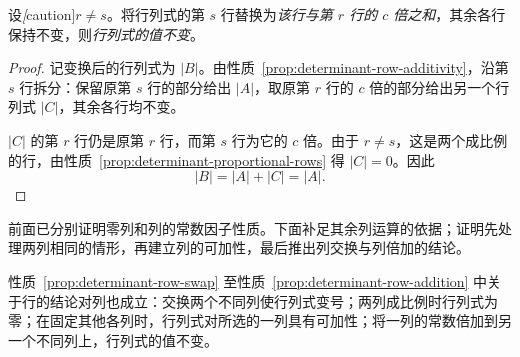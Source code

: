\begin{property}[一行的倍数加到另一行]
\label{prop:determinant-row-addition}
设\emph[caution]{$r\ne s$}。将行列式的第 $s$ 行替换为\emph{该行与第 $r$ 行的 $c$ 倍之和}，其余各行保持不变，则\emph{行列式的值不变}。
\end{property}

\begin{proof}
记变换后的行列式为 $|B|$。由性质~\ref{prop:determinant-row-additivity}，沿第 $s$ 行拆分：保留原第 $s$ 行的部分给出 $|A|$，取原第 $r$ 行的 $c$ 倍的部分给出另一个行列式 $|C|$，其余各行均不变。

$|C|$ 的第 $r$ 行仍是原第 $r$ 行，而第 $s$ 行为它的 $c$ 倍。由于 $r\ne s$，这是两个成比例的行，由性质~\ref{prop:determinant-proportional-rows} 得 $|C|=0$。因此
\[
    |B|=|A|+|C|=|A|.
\]
\end{proof}

前面已分别证明零列和列的常数因子性质。下面补足其余列运算的依据；证明先处理两列相同的情形，再建立列的可加性，最后推出列交换与列倍加的结论。

\begin{proposition}[对应的列运算性质]
\label{prop:determinant-column-operations}
性质~\ref{prop:determinant-row-swap} 至性质~\ref{prop:determinant-row-addition} 中关于行的结论对列也成立：交换两个不同列使行列式变号；两列成比例时行列式为零；在固定其他各列时，行列式对所选的一列具有可加性；将一列的常数倍加到另一个不同列上，行列式的值不变。
\end{proposition}

